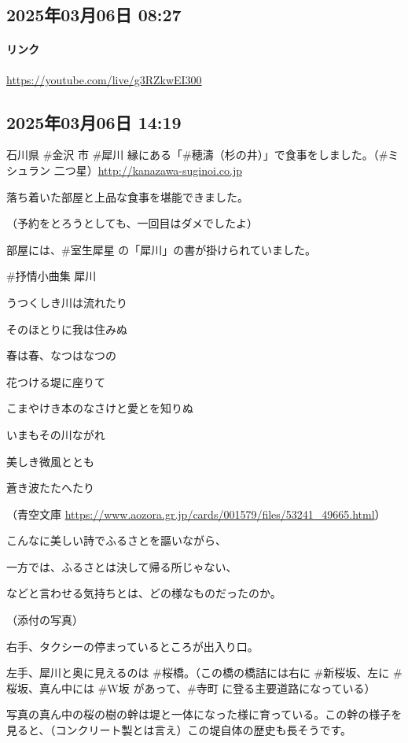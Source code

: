\subsection*{2025年03月06日 08:27}

\paragraph{リンク}
\url{https://youtube.com/live/g3RZkwEI300}

\subsection*{2025年03月06日 14:19}

石川県 \#金沢 市 \#犀川 縁にある「\#穂濤（杉の井）」で食事をしました。（\#ミシュラン 二つ星）\url{http://kanazawa-suginoi.co.jp}

落ち着いた部屋と上品な食事を堪能できました。

（予約をとろうとしても、一回目はダメでしたよ）

部屋には、\#室生犀星 の「犀川」の書が掛けられていました。

\#抒情小曲集 犀川

うつくしき川は流れたり

そのほとりに我は住みぬ

春は春、なつはなつの

花つける堤に座りて

こまやけき本のなさけと愛とを知りぬ

いまもその川ながれ

美しき微風ととも

蒼き波たたへたり

（青空文庫 \url{https://www.aozora.gr.jp/cards/001579/files/53241_49665.html}）

こんなに美しい詩でふるさとを謳いながら、

一方では、ふるさとは決して帰る所じゃない、

などと言わせる気持ちとは、どの様なものだったのか。

（添付の写真）

右手、タクシーの停まっているところが出入り口。

左手、犀川と奥に見えるのは \#桜橋。（この橋の橋詰には右に \#新桜坂、左に \#桜坂、真ん中には \#W坂 があって、\#寺町 に登る主要道路になっている）

写真の真ん中の桜の樹の幹は堤と一体になった様に育っている。この幹の様子を見ると、（コンクリート製とは言え）この堤自体の歴史も長そうです。

